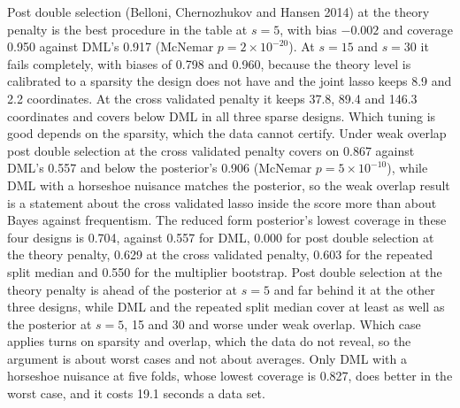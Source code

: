 Post double selection (Belloni, Chernozhukov and Hansen 2014) at the theory penalty is the best procedure in the table at $s = 5$, with bias $-0.002$ and coverage 0.950 against DML's 0.917 (McNemar $p = 2\times 10^{-20}$). At $s = 15$ and $s = 30$ it fails completely, with biases of 0.798 and 0.960, because the theory level is calibrated to a sparsity the design does not have and the joint lasso keeps 8.9 and 2.2 coordinates. At the cross validated penalty it keeps 37.8, 89.4 and 146.3 coordinates and covers below DML in all three sparse designs. Which tuning is good depends on the sparsity, which the data cannot certify. Under weak overlap post double selection at the cross validated penalty covers on 0.867 against DML's 0.557 and below the posterior's 0.906 (McNemar $p = 5\times 10^{-10}$), while DML with a horseshoe nuisance matches the posterior, so the weak overlap result is a statement about the cross validated lasso inside the score more than about Bayes against frequentism. The reduced form posterior's lowest coverage in these four designs is 0.704, against 0.557 for DML, 0.000 for post double selection at the theory penalty, 0.629 at the cross validated penalty, 0.603 for the repeated split median and 0.550 for the multiplier bootstrap. Post double selection at the theory penalty is ahead of the posterior at $s = 5$ and far behind it at the other three designs, while DML and the repeated split median cover at least as well as the posterior at $s = 5$, 15 and 30 and worse under weak overlap. Which case applies turns on sparsity and overlap, which the data do not reveal, so the argument is about worst cases and not about averages. Only DML with a horseshoe nuisance at five folds, whose lowest coverage is 0.827, does better in the worst case, and it costs 19.1 seconds a data set.

